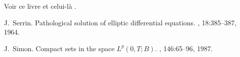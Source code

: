 \documentclass[a4paper]{article}
\begin{document}
Voir ce livre \cite{serrin} et celui-là \cite{simon}.

\begin{thebibliography}{10}
		J.~Serrin.
		\newblock Pathological solution of elliptic differential equations.
		, 18:385--387, 1964.

		J.~Simon.
		\newblock Compact sets in the space {$L^p(0,T;B)$}.
		, 146:65--96, 1987.
\end{thebibliography}
\end{document}
